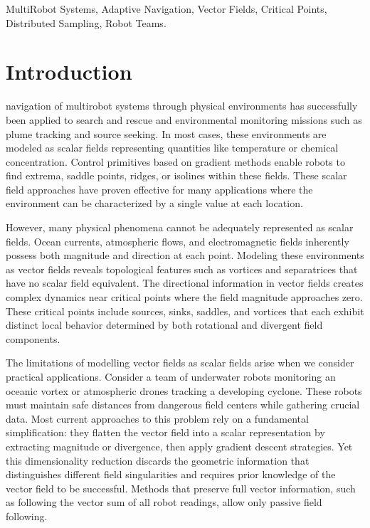 \documentclass[lettersize,journal]{IEEEtran}
\begin{document}
\begin{IEEEkeywords}
MultiRobot Systems, Adaptive Navigation, Vector Fields, Critical Points, Distributed Sampling, Robot Teams.
\end{IEEEkeywords}


\section{Introduction}
 navigation of multirobot systems through physical environments has successfully been applied to search and rescue and environmental monitoring missions such as plume tracking and source seeking. In most cases, these environments are modeled as scalar fields representing quantities like temperature or chemical concentration. Control primitives based on gradient methods enable robots to find extrema, saddle points, ridges, or isolines within these fields. These scalar field approaches have proven effective for many applications where the environment can be characterized by a single value at each location.

However, many physical phenomena cannot be adequately represented as scalar fields. Ocean currents, atmospheric flows, and electromagnetic fields inherently possess both magnitude and direction at each point. Modeling these environments as vector fields reveals topological features such as vortices and separatrices that have no scalar field equivalent. The directional information in vector fields creates complex dynamics near critical points where the field magnitude approaches zero. These critical points include sources, sinks, saddles, and vortices that each exhibit distinct local behavior determined by both rotational and divergent field components.

The limitations of modelling vector fields as scalar fields arise when we consider practical applications. Consider a team of underwater robots monitoring an oceanic vortex or atmospheric drones tracking a developing cyclone. These robots must maintain safe distances from dangerous field centers while gathering crucial data. Most current approaches to this problem rely on a fundamental simplification: they flatten the vector field into a scalar representation by extracting magnitude or divergence, then apply gradient descent strategies. Yet this dimensionality reduction discards the geometric information that distinguishes different field singularities and requires prior knowledge of the vector field to be successful. Methods that preserve full vector information, such as following the vector sum of all robot readings, allow only passive field following.
\end{document}
